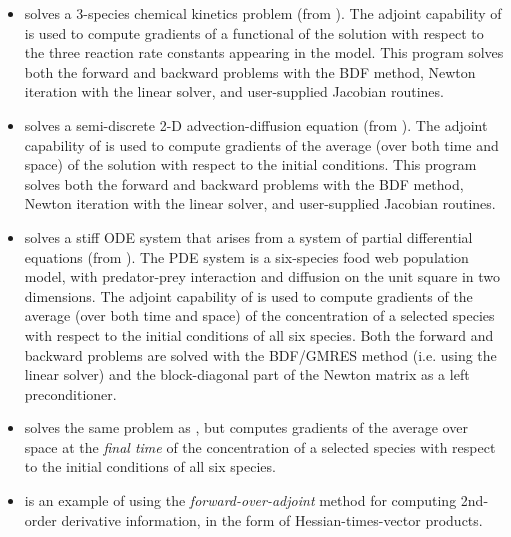\begin{itemize}
\item {}
  solves a 3-species chemical kinetics problem (from ).
  \newline
  The adjoint capability of {\cvodes} is used to compute gradients
  of a functional of the solution with respect to the three
  reaction rate constants appearing in the model.
  This program solves both the forward and backward problems with the BDF method, 
  Newton iteration with the {\cvdense} linear solver, and user-supplied    
  Jacobian routines.
\item {}
  solves a semi-discrete 2-D advection-diffusion equation (from ).
  \newline
  The adjoint capability of {\cvodes} is used to compute gradients
  of the average (over both time and space) of the solution with respect to
  the initial conditions.
  This program solves both the forward and backward problems with the BDF method, 
  Newton iteration with the {\cvband} linear solver, and user-supplied     
  Jacobian routines.
\item {}
  solves a stiff ODE system that arises from a system of partial differential
  equations (from ).  The PDE system is a six-species
  food web population model, with predator-prey interaction and diffusion 
  on the unit square in two dimensions.
  \newline
  The adjoint capability of {\cvodes} is used to compute gradients of the
  average (over both time and space) of the concentration of a selected species
  with respect to the initial conditions of all six species.
  Both the forward and backward problems are solved with the BDF/GMRES method 
  (i.e. using the {\cvspgmr} linear solver) and the block-diagonal part of the  
  Newton matrix as a left preconditioner.
\item {}
  solves the same problem as , but computes gradients of the
  average over space at the {\em final time} of the concentration of a selected species
  with respect to the initial conditions of all six species.


\item {}
  is an example of using the {\em forward-over-adjoint} method for
  computing 2nd-order derivative information, in the form of Hessian-times-vector
  products.

\end{itemize}

